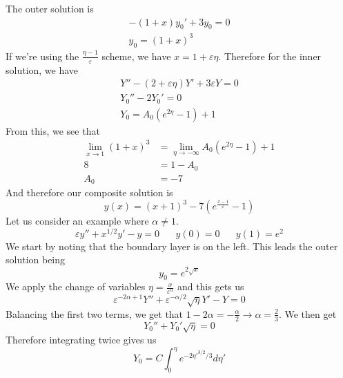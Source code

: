 \documentclass{article}
\newcommand{\twen}{\hspace{20pt}}
\begin{document}
The outer solution is 
\begin{equation*}
    \begin{split}
        -(1+x)y_0'+3y_0=0 \\
        y_0=(1+x)^3
    \end{split}
\end{equation*}
If we're using the $\frac{\eta-1}{\varepsilon}$ scheme, we have $x=1+\varepsilon \eta$. Therefore for the inner solution, we have 
\begin{equation*}
    \begin{split}
        Y''-(2+\varepsilon\eta)Y'+3\varepsilon Y =0 \\
        Y_0''-2Y_0'=0\\
        Y_0=A_0(e^{2\eta}-1)+1
    \end{split}
\end{equation*}
From this, we see that 
\begin{equation*}
    \begin{split}
        \lim_{x\to1}(1+x)^3&=\lim_{\eta \to -\infty} A_0(e^{2\eta}-1)+1\\
        8&=1-A_0\\
        A_0&=-7
    \end{split}
\end{equation*}
And therefore our composite solution is 
\begin{equation*}
    y(x)=(x+1)^3-7(e^{\frac{x-1}{\varepsilon}}-1)
\end{equation*}
Let us consider an example where $\alpha \neq 1$. 
\begin{equation*}
    \varepsilon y''+x^{1/2}y'-y=0 \twen y(0)=0 \twen y(1)=e^2 
\end{equation*}
We start by noting that the boundary layer is on the left. This leads the outer solution being 
\begin{equation*}
    y_0=e^{2\sqrt{x}}
\end{equation*}
We apply the change of variables $\eta = \frac{x}{\varepsilon^\alpha}$ and this gets us 
\begin{equation*}
    \varepsilon^{-2\alpha+1}Y''+\varepsilon^{-\alpha/2}\sqrt\eta Y'-Y=0
\end{equation*}
Balancing the first two terms, we get that $1-2\alpha = -\frac{\alpha}{2}\to \alpha=\frac{2}{3}$. We then get 
\begin{equation*}
    Y_0''+Y_0'\sqrt{\eta}=0
\end{equation*}
Therefore integrating twice gives us 
\begin{equation*}
    Y_0=C\int^\eta_0e^{-2\eta'^{3/2}/3}d\eta'
\end{equation*}
\end{document}
